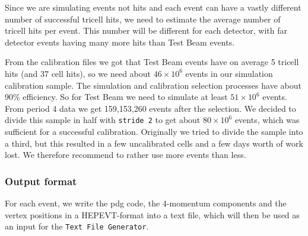 \documentclass[12pt]{article}
\begin{document}
Since we are simulating events not hits and each event can have a vastly different number of successful tricell hits, we need to estimate the average number of tricell hits per event. This number will be different for each detector, with far detector events having many more hits than Test Beam events.

From the calibration files we got that Test Beam events have on average 5 tricell hits (and 37 cell hits), so we need about $46\times10^6$ events in our simulation calibration sample. The simulation and calibration selection processes have about 90\% efficiency. So for Test Beam we need to simulate at least $51\times10^6$ events. From period 4 data we get 159,153,260 events after the selection. We decided to divide this sample in half with \texttt{stride 2} to get about $80\times10^6$ events, which was sufficient for a successful calibration. Originally we tried to divide the sample into a third, but this resulted in a few uncalibrated cells and a few days worth of work lost. We therefore recommend to rather use more events than less.

\subsubsection{Output format}\label{secHEPEVTFormat}
For each event, we write the pdg code, the 4-momentum components and the vertex positions in a HEPEVT-format \cite{HEPEVTFormat} into a text file, which will then be used as an input for the \texttt{Text File Generator}.
\end{document}
